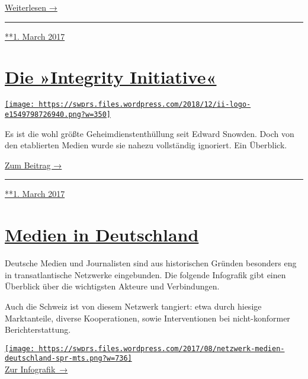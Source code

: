 \href{https://swprs.org/atlantic-council/}{Weiterlesen →}

\begin{center}\rule{0.5\linewidth}{\linethickness}\end{center}

\href{https://swprs.org/2017/03/01/der-atlantic-council/}{**1. March
2017}

\hypertarget{die-integrity-initiative}{%
\section{\texorpdfstring{\href{https://swprs.org/2017/03/01/die-integrity-initiative/}{Die
»Integrity
Initiative«}}{Die »Integrity Initiative«}}\label{die-integrity-initiative}}

\href{https://swprs.org/2017/03/01/die-integrity-initiative/}{\texttt{[image: https://swprs.files.wordpress.com/2018/12/ii-logo-e1549798726940.png?w=350]}}

Es ist die wohl größte Geheimdienstenthüllung seit Edward Snowden. Doch
von den etablierten Medien wurde sie nahezu vollständig ignoriert. Ein
Überblick.

\href{https://swprs.org/die-integrity-initiative/}{Zum Beitrag →}

\begin{center}\rule{0.5\linewidth}{\linethickness}\end{center}

\href{https://swprs.org/2017/03/01/die-integrity-initiative/}{**1. March
2017}

\hypertarget{medien-in-deutschland}{%
\section{\texorpdfstring{\href{https://swprs.org/2017/03/01/medien-in-deutschland/}{Medien
in Deutschland}}{Medien in Deutschland}}\label{medien-in-deutschland}}

Deutsche Medien und Journalisten sind aus historischen Gründen besonders
eng in trans­at­lan­tische Netz­werke eingebunden. Die folgende
Info­grafik gibt einen Über­blick über die wich­tigsten Akteure und
Ver­bindungen.

Auch die Schweiz ist von diesem Netzwerk tangiert: etwa durch hiesige
Marktanteile, diverse Kooperationen, sowie Interventionen bei
nicht-konformer Berichterstattung.

\href{https://swprs.org/netzwerk-medien-deutschland/}{\texttt{[image: https://swprs.files.wordpress.com/2017/08/netzwerk-medien-deutschland-spr-mts.png?w=736]}\\
Zur Infografik~→}

